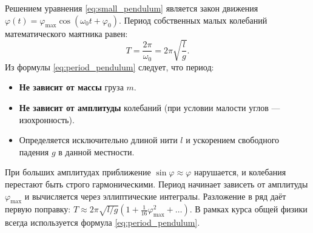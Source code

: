 \begin{property}
Решением уравнения \eqref{eq:small_pendulum} является закон движения $\varphi(t) = \varphi_{\max} \cos(\omega_0 t + \varphi_0)$. Период собственных малых колебаний математического маятника равен:
\begin{equation}
    T = \frac{2\pi}{\omega_0} = 2\pi \sqrt{\frac{l}{g}}. \label{eq:period_pendulum}
\end{equation}
Из формулы \eqref{eq:period_pendulum} следует, что период:
\begin{itemize}
    \item \textbf{Не зависит от массы} груза $m$.
    \item \textbf{Не зависит от амплитуды} колебаний (при условии малости углов --- изохронность).
    \item Определяется исключительно длиной нити $l$ и ускорением свободного падения $g$ в данной местности.
\end{itemize}
\end{property}

\begin{remark}
При больших амплитудах приближение $\sin\varphi \approx \varphi$ нарушается, и колебания перестают быть строго гармоническими. Период начинает зависеть от амплитуды $\varphi_{\max}$ и вычисляется через эллиптические интегралы. Разложение в ряд даёт первую поправку: $T \approx 2\pi\sqrt{l/g} \left(1 + \frac{1}{16}\varphi_{\max}^2 + \dots\right)$. В рамках курса общей физики всегда используется формула \eqref{eq:period_pendulum}.
\end{remark}

